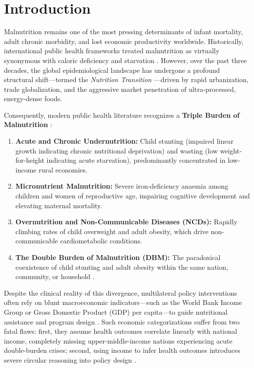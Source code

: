 \documentclass[conference]{IEEEtran}
\begin{document}
\section{Introduction}
Malnutrition remains one of the most pressing determinants of infant mortality, adult chronic morbidity, and lost economic productivity worldwide. Historically, international public health frameworks treated malnutrition as virtually synonymous with caloric deficiency and starvation \cite{who2014}. However, over the past three decades, the global epidemiological landscape has undergone a profound structural shift---termed the \textit{Nutrition Transition} \cite{popkin2001}---driven by rapid urbanization, trade globalization, and the aggressive market penetration of ultra-processed, energy-dense foods.

Consequently, modern public health literature recognizes a \textbf{Triple Burden of Malnutrition} \cite{gnr2022}:
\begin{enumerate}
    \item \textbf{Acute and Chronic Undernutrition:} Child stunting (impaired linear growth indicating chronic nutritional deprivation) and wasting (low weight-for-height indicating acute starvation), predominantly concentrated in low-income rural economies.
    \item \textbf{Micronutrient Malnutrition:} Severe iron-deficiency anaemia among children and women of reproductive age, impairing cognitive development and elevating maternal mortality.
    \item \textbf{Overnutrition and Non-Communicable Diseases (NCDs):} Rapidly climbing rates of child overweight and adult obesity, which drive non-communicable cardiometabolic conditions.
    \item \textbf{The Double Burden of Malnutrition (DBM):} The paradoxical coexistence of child stunting and adult obesity within the same nation, community, or household \cite{popkin2020}.
\end{enumerate}

Despite the clinical reality of this divergence, multilateral policy interventions often rely on blunt macroeconomic indicators---such as the World Bank Income Group or Gross Domestic Product (GDP) per capita---to guide nutritional assistance and program design \cite{wb2023}. Such economic categorizations suffer from two fatal flaws: first, they assume health outcomes correlate linearly with national income, completely missing upper-middle-income nations experiencing acute double-burden crises; second, using income to infer health outcomes introduces severe circular reasoning into policy design \cite{victora2008}.
\end{document}
